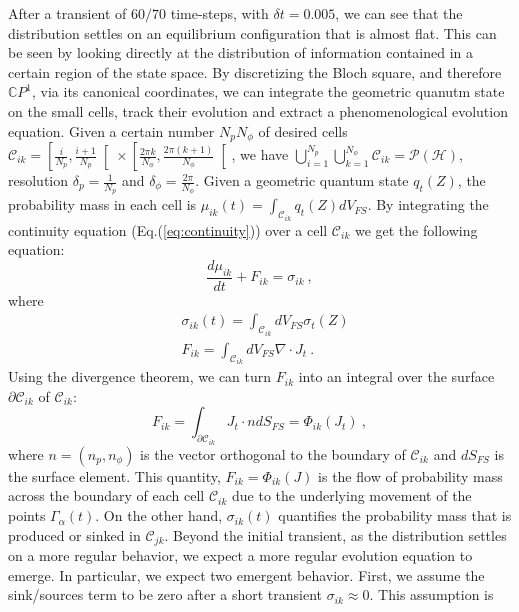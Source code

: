 \documentclass[draft,nofootinbib,pre,twocolumn,showpacs,showkeys,preprintnumbers,floatfix]{revtex4-1}
\newcommand{\CC}[2]{\mathcal{C}_{#1 #2}}
\newcommand{\1}{\mathbbm{1}}
\newcommand{\PH}{\mathcal{P}(\mathcal{H})}
\begin{document}
After a transient of $60/70$ time-steps, with $\delta t = 0.005$, we can see that the distribution
settles on an equilibrium configuration that is almost flat. This can be seen by looking
directly at the distribution of information contained in a certain region of the state space.
By discretizing the Bloch square, and therefore $\mathbb{C}P^1$, via its canonical coordinates,
we can integrate the geometric quanutm state on the small cells, track their evolution and
extract a phenomenological evolution equation. 
Given a certain number $N_p N_\phi$ of desired cells  $\mathcal{C}_{ik} = \left[ \frac{i}{N_p}, \frac{i+1}{N_p}\right[ \times \left[ \frac{2\pi k}{N_{\phi}},\frac{2\pi (k+1)}{N_{\phi}}\right[$,
we have $\bigcup_{i=1}^{N_p}\bigcup_{k=1}^{N_{\phi}}\mathcal{C}_{ik} = \PH$, resolution $\delta_p = \frac{1}{N_p}$ and
$\delta_\phi = \frac{2\pi}{N_\phi}$.
Given a geometric quantum state $q_t(Z)$, the probability mass in each cell is $\mu_{ik}(t) = \int_{\mathcal{C}_{ik}}q_t(Z) dV_{FS}$.
By integrating the continuity equation (Eq.(\ref{eq:continuity})) over a cell $\mathcal{C}_{ik}$
we get the following equation:
\begin{equation}
\frac{d\mu_{ik}}{dt} + F_{ik} = \sigma_{ik}~,
\end{equation}
where
\begin{align}
&\sigma_{ik}(t) = \int_{\mathcal{C}_{ik}} \!\!\! dV_{FS} \sigma_t(Z)  \\
&F_{ik} = \int_{\mathcal{C}_{ik}} \!\!\! dV_{FS} \nabla \cdot J_t~.
\end{align}
Using the divergence theorem, we can turn $F_{ik}$ into an integral
over the surface $\partial \CC{i}{k}$ of $\CC{i}{k}$:
\begin{equation}
F_{ik} = \int_{\partial \mathcal{C}_{ik}} \!\!\!  J_t \cdot n dS_{FS} = \Phi_{ik}(J_t)~,
\end{equation}
where $n=(n_p,n_\phi)$ is the vector orthogonal to the boundary of $\CC{i}{k}$
and $dS_{FS}$ is the surface element. This quantity, $F_{ik}=\Phi_{ik}(J)$ is 
the flow of probability mass across the boundary of each cell $\CC{i}{k}$
due to the underlying movement of the points $\Gamma_\alpha(t)$. On the other
hand, $\sigma_{ik}(t)$ quantifies the probability mass that is produced or sinked
in $\CC{j}{k}$. Beyond the initial transient, as the distribution settles on a more
regular behavior, we expect a more regular evolution equation to emerge. In
particular, we expect two emergent behavior. First, we assume the sink/sources
term to be zero after a short transient $\sigma_{ik} \approx 0$. This assumption is
\end{document}
